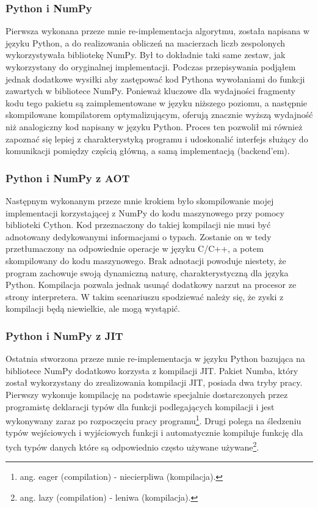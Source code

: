\documentclass[11pt, a4paper]{article}
\begin{document}
\begin{sloppypar}
    \subsubsection{Python i NumPy}
    Pierwsza wykonana przeze mnie re-implementacja algorytmu, została napisana w języku Python,
    a do realizowania obliczeń na macierzach liczb zespolonych wykorzystywała bibliotekę
    NumPy. Był to dokładnie taki same zestaw, jak wykorzystany do oryginalnej
    implementacji. Podczas przepisywania podjąłem jednak dodatkowe wysiłki aby zastępować
    kod Pythona wywołaniami do funkcji zawartych w bibliotece NumPy. Ponieważ kluczowe
    dla wydajności fragmenty kodu tego pakietu są zaimplementowane w języku niższego
    poziomu, a następnie skompilowane kompilatorem optymalizującym, oferują znacznie
    wyższą wydajność niż analogiczny kod napisany w języku Python. Proces ten pozwolił mi
    również zapoznać się lepiej z charakterystyką programu i udoskonalić interfejs służący
    do komunikacji pomiędzy częścią główną, a samą implementacją (backend'em).

    \subsubsection{Python i NumPy z AOT}
    Następnym wykonanym przeze mnie krokiem było skompilowanie mojej implementacji
    korzystającej z NumPy do kodu maszynowego przy pomocy biblioteki Cython. Kod przeznaczony
    do takiej kompilacji nie musi być adnotowany dedykowanymi informacjami o typach.
    Zostanie on w tedy przetłumaczony na odpowiednie operacje w języku C/C++, a potem skompilowany
    do kodu maszynowego. Brak adnotacji powoduje niestety, że program zachowuje swoją dynamiczną
    naturę, charakterystyczną dla języka Python. Kompilacja pozwala jednak usunąć dodatkowy
    narzut na procesor ze strony interpretera. W takim scenariuszu spodziewać należy się,
    że zyski z kompilacji będą niewielkie, ale mogą wystąpić.

    \subsubsection{Python i NumPy z JIT}
    Ostatnia stworzona przeze mnie re-implementacja w języku Python bazująca na
    bibliotece NumPy dodatkowo korzysta z kompilacji JIT. Pakiet Numba, który został
    wykorzystany do zrealizowania kompilacji JIT, posiada dwa tryby pracy. Pierwszy
    wykonuje kompilację na podstawie specjalnie dostarczonych przez programistę
    deklaracji typów dla funkcji podlegających kompilacji i jest wykonywany zaraz po
    rozpoczęciu pracy programu\footnote{ang. eager (compilation) - niecierpliwa (kompilacja).}.
    Drugi polega na śledzeniu typów wejściowych i wyjściowych funkcji i automatycznie kompiluje
    funkcję dla tych typów danych które są odpowiednio często używane używane\footnote{ang.
    lazy (compilation) - leniwa (kompilacja).}.


\end{sloppypar}
\end{document}
